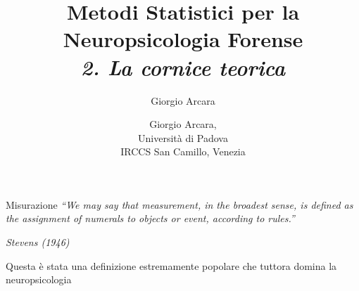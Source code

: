 \documentclass[
  ignorenonframetext,
]{beamer}
\author{Giorgio Arcara}
\date{}
\begin{document}
\begin{frame}
\title{Metodi Statistici per la Neuropsicologia Forense\\ \vspace{1em} \emph{2. La cornice teorica}}
\author{Giorgio Arcara,\\ Università di Padova \\ IRCCS San Camillo, Venezia}

\maketitle
\end{frame}

\begin{frame}{Misurazione}
\label{misurazione}
\emph{``We may say that measurement, in the broadest sense, is defined
as the assignment of numerals to objects or event, according to
rules.''}

\emph{Stevens (1946)} \pause \vspace{2em}

Questa è stata una definizione estremamente popolare che tuttora domina
la neuropsicologia
\end{frame}
\end{document}
